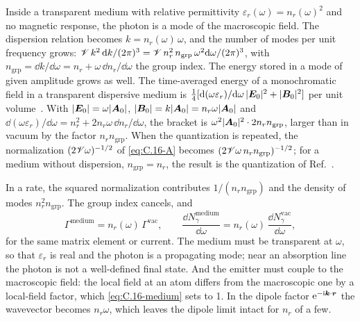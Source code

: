 Inside a transparent medium with relative permittivity $\varepsilon_r(\omega) = n_r(\omega)^2$ and no magnetic response, the photon is a mode of the macroscopic field. The dispersion relation becomes $k = n_r(\omega)\,\omega$, and the number of modes per unit frequency grows: $\mathscr{V}\,k^2\,\mathrm{d} k/(2\pi)^3 = \mathscr{V}\,n_r^2\,n_{\mathrm{grp}}\,\omega^2\mathrm{d}\omega/(2\pi)^3$, with $n_{\mathrm{grp}} = \dd k/\dd\omega = n_r + \omega\,\dd n_r/\dd\omega$ the group index. The energy stored in a mode of given amplitude grows as well. The time-averaged energy of a monochromatic field in a transparent dispersive medium is $\tfrac14[\mathrm{d}(\omega\varepsilon_r)/\mathrm{d}\omega\,|\bm{E}_0|^2 + |\bm{B}_0|^2]$ per unit volume~\cite{jackson1999classical}. With $|\bm{E}_0| = \omega|\bm{A}_0|$, $|\bm{B}_0| = k|\bm{A}_0| = n_r\omega|\bm{A}_0|$ and $\dd(\omega\varepsilon_r)/\dd\omega = n_r^2 + 2n_r\omega\,\dd n_r/\dd\omega$, the bracket is $\omega^2|\bm{A}_0|^2\cdot2n_rn_{\mathrm{grp}}$, larger than in vacuum by the factor $n_rn_{\mathrm{grp}}$. When the quantization is repeated, the normalization $(2\mathscr{V}\omega)^{-1/2}$ of \cref{eq:C.16-A} becomes $(2\mathscr{V}\omega\,n_rn_{\mathrm{grp}})^{-1/2}$; for a medium without dispersion, $n_{\mathrm{grp}} = n_r$, the result is the quantization of Ref.~\cite{glauber1991quantum}.

In a rate, the squared normalization contributes $1/(n_rn_{\mathrm{grp}})$ and the density of modes $n_r^2n_{\mathrm{grp}}$. The group index cancels, and
\begin{equation}
  \varGamma^{\mathrm{medium}} = n_r(\omega)\,\varGamma^{\mathrm{vac}}, \qquad
  \frac{\dd N_\gamma^{\mathrm{medium}}}{\dd\omega} = n_r(\omega)\,\frac{\dd N_\gamma^{\mathrm{vac}}}{\dd\omega},
  \label{eq:C.16-medium}
\end{equation}
for the same matrix element or current. The medium must be transparent at $\omega$, so that $\varepsilon_r$ is real and the photon is a propagating mode; near an absorption line the photon is not a well-defined final state. And the emitter must couple to the macroscopic field: the local field at an atom differs from the macroscopic one by a local-field factor, which \cref{eq:C.16-medium} sets to 1. In the dipole factor $\mathrm{e}^{-\mathrm{i}\bm{k}\cdot\bm{r}}$ the wavevector becomes $n_r\omega$, which leaves the dipole limit intact for $n_r$ of a few.
